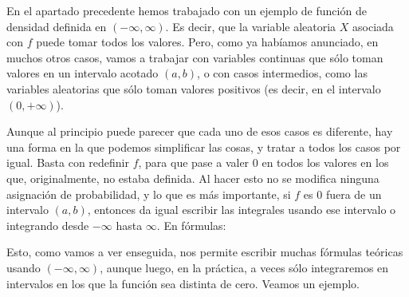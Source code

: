 En el apartado precedente hemos trabajado con un ejemplo de función de densidad definida en $(-\infty, \infty)$. Es decir, que la variable aleatoria $X$ asociada con $f$ puede tomar todos los valores. Pero, como ya habíamos anunciado, en muchos otros casos, vamos a trabajar con variables continuas que sólo toman valores en un intervalo acotado $(a,b)$, o con casos intermedios, como las variables aleatorias que sólo toman valores positivos (es decir, en el intervalo $(0,+\infty)$).

Aunque al principio puede parecer que cada uno de esos casos es diferente, hay una forma en la que podemos simplificar las cosas, y tratar a todos los casos por igual. {\sf Basta con redefinir $f$, para que pase a valer $0$ en todos los valores en los que, originalmente, no estaba definida.} Al hacer esto no se modifica ninguna asignación de probabilidad, y lo que es más importante, si $f$ es $0$ fuera de un intervalo $(a,b)$, entonces da igual escribir las integrales usando ese intervalo o integrando desde $-\infty$ hasta $\infty$. En fórmulas:
    \begin{center}
    \end{center}
Esto, como vamos a ver enseguida, nos permite escribir muchas fórmulas teóricas usando $(-\infty,\infty)$, aunque luego, en la práctica, a veces sólo integraremos en intervalos en los que la función sea distinta de cero. Veamos un ejemplo.
